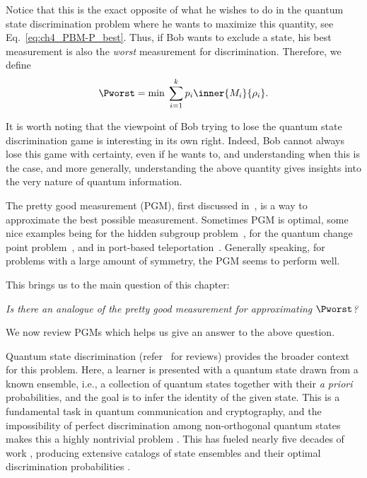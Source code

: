 Notice that this is the exact opposite of what he wishes to do in the quantum state discrimination problem where he wants to maximize this quantity, see Eq.~\eqref{eq:ch4_PBM-P_best}. 
Thus, if Bob wants to exclude a state, his best measurement is also the \emph{worst} measurement for discrimination. 
Therefore, we define 
\begin{equation}
    \label{eq:ch4_PBM-P_worst}
    \Pworst = \text{min} \; \sum_{i=1}^k p_i \inner{M_i}{\rho_i}. 
\end{equation}

It is worth noting that the viewpoint of Bob trying to lose the quantum state discrimination game is interesting in its own right. 
Indeed, Bob cannot always lose this game with certainty, even if he wants to, and understanding when this is the case, and more generally, understanding the above quantity gives insights into the very nature of quantum information. 


The pretty good measurement (PGM), first discussed in~\cite{belavkin1975optimaldist, belavkin1975optimal, hughston1993complete}, is a way to approximate the best possible measurement. 
Sometimes PGM is optimal, some nice examples being for the hidden subgroup problem~\cite{bacon2005optimal, moore2005distinguishing}, for the quantum change point problem~\cite{sentis2016quantum}, and in port-based teleportation~\cite{leditzky2022optimality}.  
Generally speaking, for problems with a large amount of symmetry, the PGM seems to perform well. 

This brings us to the main question of this chapter:
\begin{center}
\textit{Is there an analogue of the pretty good measurement for approximating $\Pworst$?} 
\end{center}

We now review PGMs which helps us give an answer to the above question.

Quantum state discrimination (refer~\cite{chefles1998quantum, barnett2009quantum,bae2015quantum, bergou2004discrimination} for reviews) provides the broader context for this problem. 
Here, a learner is presented with a quantum state drawn from a known ensemble, i.e., a collection of quantum states together with their \textit{a priori} probabilities, and the goal is to infer the identity of the given state. 
This is a fundamental task in quantum communication and cryptography, and the impossibility of perfect discrimination among non-orthogonal quantum states makes this a highly nontrivial problem \cite{nielsen2010quantum}. 
This has fueled nearly five decades of work \cite{helstrom1969quantum}, producing extensive catalogs of state ensembles and their optimal discrimination probabilities \cite{sun2001optimum,sugimoto2010complete,herzog2004minimum,herzog2005optimum,herzog2015optimal}. 

